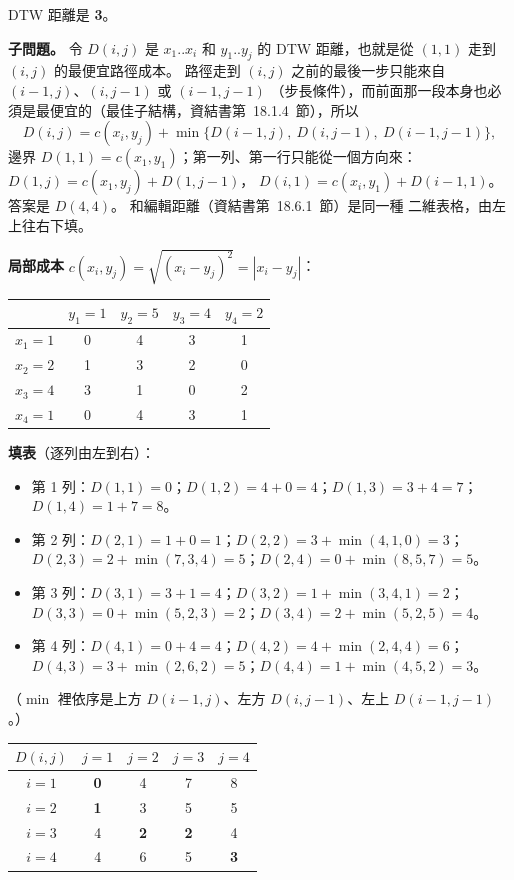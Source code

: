\begin{pastsoln}
DTW 距離是 \textbf{3}。

\textbf{子問題。} 令 $D(i, j)$ 是 $x_1..x_i$ 和 $y_1..y_j$ 的 DTW 距離，也就是從 $(1, 1)$ 走到 $(i, j)$
的最便宜路徑成本。 路徑走到 $(i, j)$ 之前的最後一步只能來自 $(i-1, j)$、$(i, j-1)$ 或 $(i-1, j-1)$
（步長條件），而前面那一段本身也必須是最便宜的（最佳子結構，資結書第~18.1.4~節），所以
\[
D(i, j) = c(x_i, y_j) + \min\{D(i-1, j),\ D(i, j-1),\ D(i-1, j-1)\},
\]
邊界 $D(1, 1) = c(x_1, y_1)$；第一列、第一行只能從一個方向來：$D(1, j) = c(x_1, y_j) + D(1, j-1)$，
$D(i, 1) = c(x_i, y_1) + D(i-1, 1)$。 答案是 $D(4, 4)$。 和編輯距離（資結書第~18.6.1~節）是同一種
二維表格，由左上往右下填。

\textbf{局部成本} $c(x_i, y_j) = \sqrt{(x_i - y_j)^2} = |x_i - y_j|$：
\begin{center}
\begin{tabular}{c|cccc}
 & $y_1 = 1$ & $y_2 = 5$ & $y_3 = 4$ & $y_4 = 2$ \\ \hline
$x_1 = 1$ & 0 & 4 & 3 & 1 \\
$x_2 = 2$ & 1 & 3 & 2 & 0 \\
$x_3 = 4$ & 3 & 1 & 0 & 2 \\
$x_4 = 1$ & 0 & 4 & 3 & 1 \\
\end{tabular}
\end{center}

\textbf{填表}（逐列由左到右）：
\begin{itemize}
\item 第 1 列：$D(1,1) = 0$；$D(1,2) = 4 + 0 = 4$；$D(1,3) = 3 + 4 = 7$；$D(1,4) = 1 + 7 = 8$。
\item 第 2 列：$D(2,1) = 1 + 0 = 1$；$D(2,2) = 3 + \min(4, 1, 0) = 3$；
$D(2,3) = 2 + \min(7, 3, 4) = 5$；$D(2,4) = 0 + \min(8, 5, 7) = 5$。
\item 第 3 列：$D(3,1) = 3 + 1 = 4$；$D(3,2) = 1 + \min(3, 4, 1) = 2$；
$D(3,3) = 0 + \min(5, 2, 3) = 2$；$D(3,4) = 2 + \min(5, 2, 5) = 4$。
\item 第 4 列：$D(4,1) = 0 + 4 = 4$；$D(4,2) = 4 + \min(2, 4, 4) = 6$；
$D(4,3) = 3 + \min(2, 6, 2) = 5$；$D(4,4) = 1 + \min(4, 5, 2) = 3$。
\end{itemize}
（$\min$ 裡依序是上方 $D(i-1, j)$、左方 $D(i, j-1)$、左上 $D(i-1, j-1)$。）
\begin{center}
\begin{tabular}{c|cccc}
$D(i, j)$ & $j = 1$ & $j = 2$ & $j = 3$ & $j = 4$ \\ \hline
$i = 1$ & \textbf{0} & 4 & 7 & 8 \\
$i = 2$ & \textbf{1} & 3 & 5 & 5 \\
$i = 3$ & 4 & \textbf{2} & \textbf{2} & 4 \\
$i = 4$ & 4 & 6 & 5 & \textbf{3} \\
\end{tabular}
\end{center}


\end{pastsoln}

